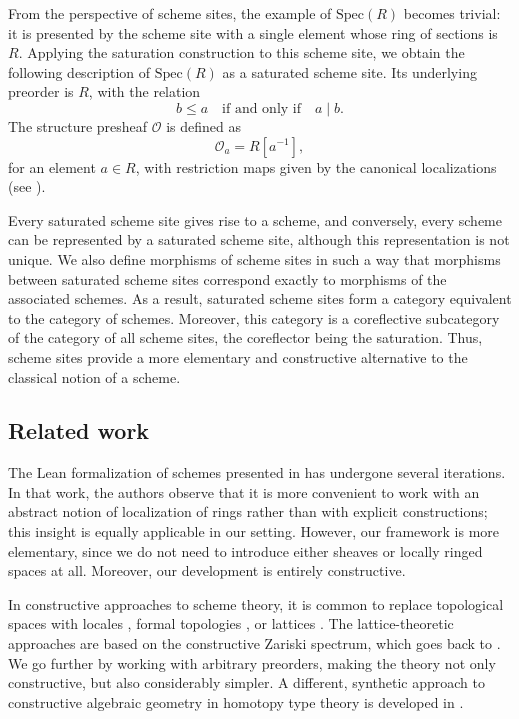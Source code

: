 \documentclass[reqno]{amsart}
\theoremstyle{definition}
\theoremstyle{remark}
\numberwithin{figure}{section}
\begin{document}
From the perspective of scheme sites, the example of $\mathrm{Spec}(R)$ becomes trivial:
it is presented by the scheme site with a single element whose ring of sections is $R$.
Applying the saturation construction to this scheme site, we obtain the following description of $\mathrm{Spec}(R)$ as a saturated scheme site.
Its underlying preorder is $R$, with the relation
\[
b \leq a \quad \text{if and only if} \quad a \mid b.
\]
The structure presheaf $\mathcal{O}$ is defined as
\[
\mathcal{O}_a = R[a^{-1}],
\]
for an element $a \in R$, with restriction maps given by the canonical localizations (see ).

Every saturated scheme site gives rise to a scheme, and conversely, every scheme can be represented by a saturated scheme site, although this representation is not unique.
We also define morphisms of scheme sites in such a way that morphisms between saturated scheme sites correspond exactly to morphisms of the associated schemes.
As a result, saturated scheme sites form a category equivalent to the category of schemes.
Moreover, this category is a coreflective subcategory of the category of all scheme sites, the coreflector being the saturation.
Thus, scheme sites provide a more elementary and constructive alternative to the classical notion of a scheme.

\subsection{Related work}

The Lean formalization of schemes presented in \cite{schemes-lean} has undergone several iterations.
In that work, the authors observe that it is more convenient to work with an abstract notion of localization of rings rather than with explicit constructions; this insight is equally applicable in our setting.
However, our framework is more elementary, since we do not need to introduce either sheaves or locally ringed spaces at all.
Moreover, our development is entirely constructive.

In constructive approaches to scheme theory, it is common to replace topological spaces with locales \cite{blechschmidt}, formal topologies \cite{schemes-schuster}, or lattices \cite{schemes-zeuner,schemes-coquand}.
The lattice-theoretic approaches are based on the constructive Zariski spectrum, which goes back to \cite{joyal-spectrum}.
We go further by working with arbitrary preorders, making the theory not only constructive, but also considerably simpler.
A different, synthetic approach to constructive algebraic geometry in homotopy type theory is developed in \cite{synthetic-ag}.
\end{document}
